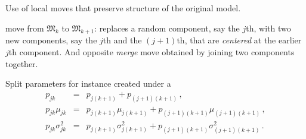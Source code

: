 \begin{slide}
\end{slide}\begin{slide}


\end{slide}\begin{slide}

Use of local moves that preserve structure of the original model.

 move from
${\mathfrak M}_k$ to ${\mathfrak M}_{k+1}$: replaces a random component, say
the $j$th, with two new components, say the $j$th and the $(j+1)$th,
that are {\em centered} at the earlier $j$th component.  And opposite {\em merge} move
obtained by joining two components together.

\end{slide}\begin{slide}

Split parameters for instance created under a 
\small$$
\begin{array}{lll}
p_{jk} &=& p_{j(k+1)} +  p_{(j+1)(k+1)} \,, \\
p_{jk} \mu_{jk} &=& p_{j(k+1)} \mu_{j(k+1)} + p_{(j+1)(k+1)}
          \mu_{(j+1)(k+1)}\,,\\
p_{jk} \sigma_{jk}^2 &=& p_{j(k+1)} \sigma_{j(k+1)}^2 + p_{(j+1)(k+1)}
    \sigma_{(j+1)(k+1)}^2\,.
\end{array}
$$\normalsize


\end{slide}
